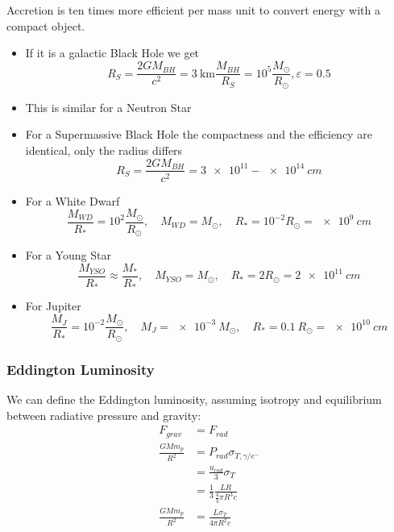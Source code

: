 \documentclass[10pt,a4paper,english,draft]{article}
\begin{document}
Accretion is ten times more efficient per mass unit to convert energy with a compact object.
\begin{itemize}
  \item If it is a galactic Black Hole we get
  \begin{equation}
  R_{S} =\frac{2GM_{BH}}{c^{2}} = \SI{3}{\km} \frac{M_{BH}}{R_{S}} = 10^5\frac{M_{\odot}}{R_{\odot}} , \varepsilon = 0.5
  \end{equation}
  \item This is similar for a Neutron Star
  \item For a Supermassive Black Hole the compactness and the efficiency are identical, only the radius differs
  \begin{equation}
  R_{S} =\frac{2GM_{BH}}{c^{2}} = \num{3e11}-\SI{e14}{cm}
  \end{equation}
  \item For a White Dwarf
  \begin{equation}
  \frac {M_{WD}}{R_{*}} =10^{2}\frac{M_{\odot}}{R_{\odot}} ,\quad M_{WD} = M_{\odot},\quad R_{*}=10^{-2}R_{\odot} = \SI{e9}{cm}
  \end{equation}
  \item For a Young Star
  \begin{equation}
  \frac {M_{YSO}}{R_{*}} \approx \frac{M_{*}}{R_{*}} ,\quad M_{YSO} = M_{\odot},\quad R_{*}=2R_{\odot} = \SI{2e11}{cm}
  \end{equation}
  \item For Jupiter
  \begin{equation}
  \frac {M_{J}}{R_{*}} = 10^{-2}\frac{M_{\odot}}{R_{\odot}} ,\quad M_{J} = \SI{e-3}{M_{\odot}},\quad R_{*}=\SI{0.1}{R_{\odot}} = \SI{e10}{cm}
  \end{equation}
\end{itemize}

\subsubsection{Eddington Luminosity}
We can define the Eddington luminosity, assuming isotropy and equilibrium between radiative pressure and gravity:
\begin{align}
  F_{grav} & = F_{rad} \\
  \frac{GMm_p}{R^2} &= P_{rad}\sigma_{T,\gamma/e^{-}} \\
           & = \frac{u_{rad}}{3}\sigma_T \\
           &= \frac{1}{3}\frac{LR}{\frac{4}{3}\pi R^3 c}\\
  \frac{GMm_p}{R^2} &= \frac{L\sigma_T}{4\pi R^2 c}
\end{align}
\end{document}
